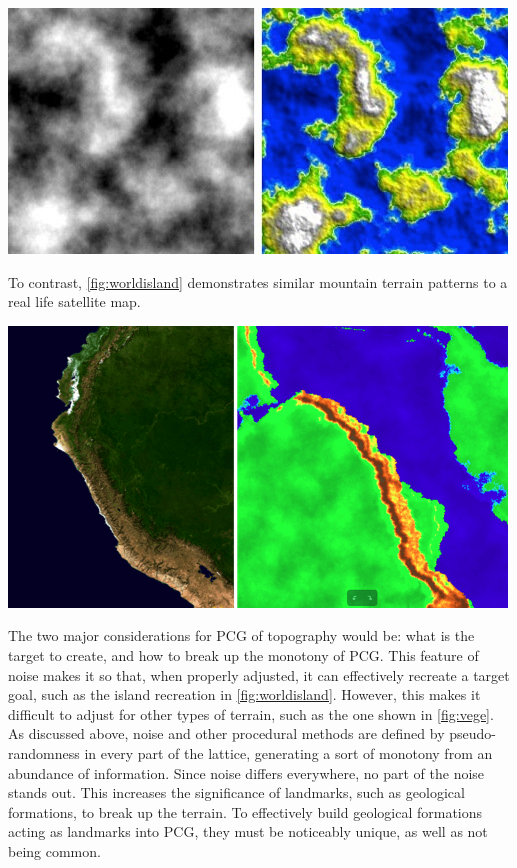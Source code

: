\documentclass[10pt]{report}
\begin{document}
		\begin{minipage}{\textwidth}
			\centering
			\includegraphics[scale=0.6]{03-simplex-noise-preview-opt}
			\label{fig:simpleisland}
		\end{minipage}
	
		To contrast, \autoref{fig:worldisland} demonstrates similar mountain terrain patterns to a real life satellite map. 
		
		\begin{minipage}{\textwidth}
			\centering
			\includegraphics[scale=0.6]{04-worldengine-1-preview-opt}
			\label{fig:worldisland}
		\end{minipage}
	
		The two major considerations for PCG of topography would be: what is the target to create, and how to break up the monotony of PCG. This feature of noise makes it so that, when properly adjusted, it can effectively recreate a target goal, such as the island recreation in \autoref{fig:worldisland}. However, this makes it difficult to adjust for other types of terrain, such as the one shown in \autoref{fig:vege}. As discussed above, noise and other procedural methods are defined by pseudo-randomness in every part of the lattice, generating a sort of monotony from an abundance of information. Since noise differs everywhere, no part of the noise stands out. This increases the significance of landmarks, such as geological formations, to break up the terrain. To effectively build geological formations acting as landmarks into PCG, they must be noticeably unique, as well as not being common. 
	
\end{document}
